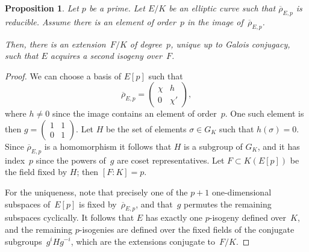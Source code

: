 \documentclass[twoside,leqno,symbols-for-thanks, draft]{rmi}
\numberwithin{equation}{section}
\newcommand{\rhobar}{{\overline{\rho}}}
\newtheorem{proposition}[theorem]{Proposition}
\theoremstyle{remark}
\begin{document}
\begin{proposition} \label{P:fieldF}
Let $p$ be a prime. Let $E/K$ be an elliptic curve such that
$\rhobar_{E,p}$ is reducible. Assume there is an element of order~$p$
in the image of~$\rhobar_{E,p}$.

Then, there is an extension~$F/K$ of degree~$p$, unique up to Galois
conjugacy, such that $E$ acquires a second isogeny over~$F$.
\end{proposition}
\begin{proof} We can choose a basis of $E[p]$ such that
\[
\rhobar_{E,p} =  \begin{pmatrix}
                            \chi& h \\
                            0 & \chi'
                            \end{pmatrix},
\]
where $h\neq0$ since the image contains an element of order~$p$.  One
such element is then $g=\left(\begin{smallmatrix} 1 & 1 \\ 0 &
  1 \end{smallmatrix} \right)$.  Let $H$ be the set of elements
$\sigma \in G_K$ such that $h(\sigma) = 0$. Since $\rhobar_{E,p}$ is a
homomorphism it follows that $H$ is a subgroup of $G_K$, and it has
index~$p$ since the powers of~$g$ are coset representatives.  Let $F
\subset K(E[p])$ be the field fixed by $H$; then $[F : K] =p$.

For the uniqueness, note that precisely one of the $p+1$
one-dimensional subspaces of~$E[p]$ is fixed by~$\rhobar_{E,p}$, and
that~$g$ permutes the remaining subspaces cyclically.  It follows that
$E$ has exactly one $p$-isogeny defined over~$K$, and the remaining
$p$-isogenies are defined over the fixed fields of the conjugate
subgroups~$g^iHg^{-i}$, which are the extensions conjugate to~$F/K$.
\end{proof}
\end{document}
